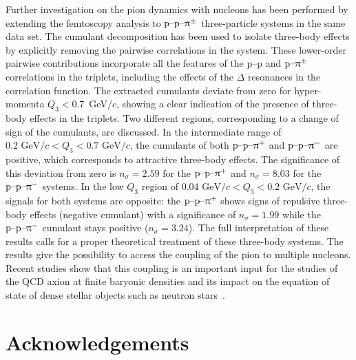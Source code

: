 \documentclass[ALICE,manyauthors]{cernphprep}
\begin{document}
Further investigation on the pion dynamics with nucleons has been performed by extending the femtoscopy analysis to $\text{p--p--}\uppi^\pm$ three-particle systems in the same data set. The cumulant decomposition has been used to isolate three-body effects by explicitly removing the pairwise correlations in the system. These lower-order pairwise contributions incorporate all the features of the p--p and $\text{p--}\uppi^\pm$ correlations in the triplets, including the effects of the $\Delta$ resonances in the correlation function. The extracted cumulants deviate from zero for hyper-momenta $Q_3 < 0.7$~GeV$/c$, showing a clear indication of the presence of three-body effects in the triplets. Two different regions, corresponding to a change of sign of the cumulants, are discussed. In the intermediate range of $0.2\text{ GeV}/c < Q_3 < 0.7\text{ GeV}/c$, the cumulants of both $\text{p--p--}\uppi^+$ and $\text{p--p--}\uppi^-$ are positive, which corresponds to attractive three-body effects. The significance of this deviation from zero is $n_\sigma = 2.59$ for the $\text{p--p--}\uppi^+$ and $n_\sigma = 8.03$ for the $\text{p--p--}\uppi^-$ systems. In the low $Q_3$ region of $0.04\text{ GeV}/c < Q_3 < 0.2\text{ GeV}/c$, the signals for both systems are opposite: the $\text{p--p--}\uppi^+$ shows signs of repulsive three-body effects (negative cumulant) with a significance of $n_\sigma = 1.99$ while the $\text{p--p--}\uppi^-$ cumulant stays positive ($n_\sigma = 3.24$). The full interpretation of these results calls for a proper theoretical treatment of these three-body systems. The results give the possibility to access the coupling of the pion to multiple nucleons. Recent studies show that this coupling is an important input for the studies of the QCD axion at finite baryonic densities and its impact on the equation of state of dense stellar objects such as neutron stars~\cite{Balkin:2020dsr}.


\clearpage
\newenvironment{acknowledgement}{\relax}{\relax}
\begin{acknowledgement}


\section*{Acknowledgements}

\end{acknowledgement}
\end{document}
